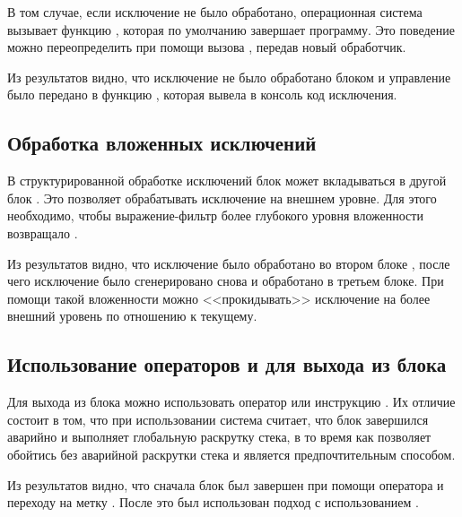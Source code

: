 В том случае, если исключение не было обработано, операционная система вызывает функцию , которая по умолчанию завершает программу. Это поведение можно переопределить при помощи вызова , передав новый обработчик.


Из результатов видно, что исключение не было обработано блоком  и управление было передано в функцию , которая вывела в консоль код исключения.

\subsection{Обработка вложенных исключений}

В структурированной обработке исключений блок  может вкладываться в другой блок . Это позволяет обрабатывать исключение на внешнем уровне. Для этого необходимо, чтобы выражение-фильтр более глубокого уровня вложенности возвращало .


Из результатов видно, что исключение было обработано во втором блоке , после чего исключение было сгенерировано снова и обработано в третьем блоке. При помощи такой вложенности можно <<прокидывать>> исключение на более внешний уровень по отношению к текущему.

\subsection{Использование операторов  и  для выхода из блока }
\label{sec:gotoleave}

Для выхода из блока  можно использовать оператор  или инструкцию . Их отличие состоит в том, что при использовании  система считает, что блок завершился аварийно и выполняет глобальную раскрутку стека, в то время как  позволяет обойтись без аварийной раскрутки стека и является предпочтительным способом.


Из результатов видно, что сначала блок  был завершен при помощи оператора  и переходу на метку . После это был использован подход с использованием .

